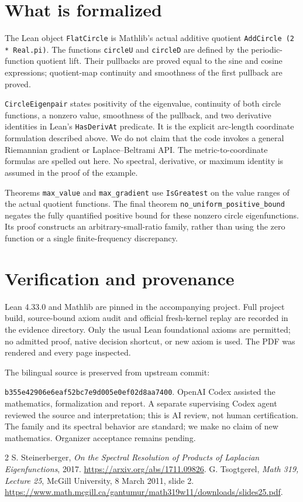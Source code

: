 \documentclass[11pt]{article}
\begin{document}
\section{What is formalized}
The Lean object \texttt{FlatCircle} is Mathlib's actual additive quotient
\texttt{AddCircle (2 * Real.pi)}. The functions \texttt{circleU} and
\texttt{circleD} are defined by the periodic-function quotient lift.
Their pullbacks are proved equal to the sine and cosine expressions;
quotient-map continuity and smoothness of the first pullback are proved.

\texttt{CircleEigenpair} states positivity of the eigenvalue, continuity
of both circle functions, a nonzero value, smoothness of the pullback,
and two derivative identities in Lean's \texttt{HasDerivAt} predicate.
It is the explicit arc-length coordinate formulation described above.
We do not claim that the code invokes a general Riemannian gradient or
Laplace--Beltrami API. The metric-to-coordinate formulas are spelled out
here. No spectral, derivative, or maximum identity is assumed
in the proof of the example.

Theorems \texttt{max\_value} and \texttt{max\_gradient} use
\texttt{IsGreatest} on the value ranges of the actual quotient functions.
The final theorem \texttt{no\_uniform\_positive\_bound} negates the fully
quantified positive bound for these nonzero circle eigenfunctions. Its
proof constructs an arbitrary-small-ratio family, rather than using the
zero function or a single finite-frequency discrepancy.

\section{Verification and provenance}
Lean 4.33.0 and Mathlib are pinned in the accompanying project. Full
project build, source-bound axiom audit and official fresh-kernel replay
are recorded in the evidence directory. Only the usual Lean foundational
axioms are permitted; no admitted proof, native decision shortcut, or new
axiom is used. The PDF was rendered and every page inspected.

The bilingual source is preserved from upstream commit:\par\noindent
\texttt{b355e42906e6eaf52bc7e9d005e0ef02d8aa7400}.
OpenAI Codex assisted the mathematics, formalization and report. A separate
supervising Codex agent reviewed the source and interpretation; this is AI
review, not human certification. The family and its spectral behavior are
standard; we make no claim of new mathematics. Organizer acceptance remains
pending.

\begin{thebibliography}{2}
 S. Steinerberger,
\emph{On the Spectral Resolution of Products of Laplacian Eigenfunctions},
2017. \url{https://arxiv.org/abs/1711.09826}.
 G. Tsogtgerel, \emph{Math 319, Lecture 25},
McGill University, 8 March 2011, slide 2.
\url{https://www.math.mcgill.ca/gantumur/math319w11/downloads/slides25.pdf}.
\end{thebibliography}
\end{document}
